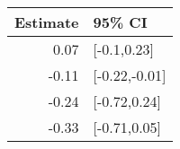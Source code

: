 \begin{tabular}{rl}
  \hline
Estimate & 95\% CI \\ 
  \hline
0.07 & [-0.1,0.23] \\ 
  -0.11 & [-0.22,-0.01] \\ 
  -0.24 & [-0.72,0.24] \\ 
  -0.33 & [-0.71,0.05] \\ 
   \hline
\end{tabular}

